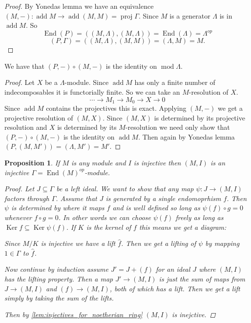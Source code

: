 \documentclass[11pt, a4paper, english]{article}
\newtheorem{prop}[theorem]{Proposition}
\theoremstyle{definition}
\DeclareMathOperator{\End}{End}
\DeclareMathOperator{\Ker}{Ker}
\DeclareMathOperator{\proj}{proj}
\DeclareMathOperator{\add}{add}
\def\mod{\operatorname{mod}}
\begin{document}
\begin{proof}
	By Yonedas lemma we have an equivalence $(M,-):\add M \to \add (M,M)=\proj\Gamma$. Since $M$ is a generator $\Lambda$ is in $\add M$. So $$\End(P)=((M,\Lambda), (M,\Lambda)) = \End(\Lambda)=\Lambda^{op}$$  $$(P,\Gamma)=((M,\Lambda),(M,M))=(\Lambda,M)=M.$$
\end{proof}

We have that $(P,-)\circ (M,-)$ is the identity on $\mod\Lambda$.

\begin{proof}
	Let $X$ be a $\Lambda$-module. Since $\add M$ has only a finite number of indecomposables it is functorially finite. So we can take an $M$-resolution of $X$.
	$$\cdots \to M_1 \to M_0 \to X \to 0$$
	Since $\add M$ contains the projectives this is exact. Applying $(M,-)$ we get a projective resolution of $(M,X)$. Since $(M, X)$ is determined by its projective resolution and $X$ is determined by its $M$-resolution we need only show that $(P,-)\circ (M,-)$ is the identity on $\add M$. Then again by Yonedas lemma $(P, (M, M')) = (\Lambda, M')=M'$.
\end{proof}

\begin{prop}\label{prop:hom_preserves_injectives}
	If $M$ is any module and $I$ is injective then $(M,I)$ is an injective $\Gamma=\End(M)^{op}$-module.
	\begin{proof}
		Let $J \subseteq \Gamma$ be a left ideal. We want to show that any map $\psi:J \to (M,I)$ factors through $\Gamma$. Assume that $J$ is generated by a single endomoprhism $f$. Then $\psi$ is determined by where it maps $f$ and is well defined so long as $\psi(f)\circ g = 0$ whenever $f\circ g=0$. In other words we can choose $\psi(f)$ freely as long as $\Ker f \subseteq \Ker \psi(f)$. If $K$ is the kernel of $f$ this means we get a diagram:
		\begin{center}
		\end{center}
		Since $M/K$ is injective we have a lift $\hat{f}$. Then we get a lifting of $\psi$ by mapping $1\in\Gamma$ to $\hat{f}$.
		
		Now continue by induction  assume $J' = J + (f)$ for an ideal $J$ where $(M, I)$ has the lifting property. Then a map $J' \to (M,I)$ is just the sum of maps from $J \to (M, I)$ and $(f) \to (M,I)$, both of which has a lift. Then we get a lift simply by taking the sum of the lifts.
		
		Then by \cref{lem:injectives_for_noetherian_ring} $(M, I)$ is inejctive.
	\end{proof}
\end{prop}
\end{document}
